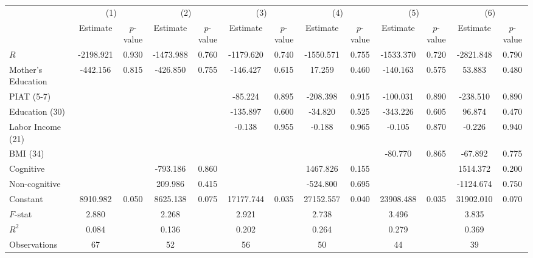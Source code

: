 
\begin{tabular}{lcccccccccccc} \toprule
 & \multicolumn{2}{c}{(1)}  &  \multicolumn{2}{c}{(2)}  &  \multicolumn{2}{c}{(3)}  &  \multicolumn{2}{c}{(4)}  & \multicolumn{2}{c}{(5)} & \multicolumn{2}{c}{(6)} \\  
 & Estimate & $p$-value & Estimate & $p$-value & Estimate & $p$-value & Estimate & $p$-value & Estimate & $p$-value & Estimate & $p$-value \\ \midrule
$R$ & -2198.921 &     0.930 & -1473.988 &     0.760 & -1179.620 &     0.740 & -1550.571 &     0.755 & -1533.370 &     0.720 & -2821.848 &     0.790 \\  
Mother's Education &  -442.156 &     0.815 &  -426.850 &     0.755 &  -146.427 &     0.615 &    17.259 &     0.460 &  -140.163 &     0.575 &    53.883 &     0.480 \\  
PIAT (5-7) &         &         &         &         &   -85.224 &     0.895 &  -208.398 &     0.915 &  -100.031 &     0.890 &  -238.510 &     0.890 \\  
Education (30) &         &         &         &         &  -135.897 &     0.600 &   -34.820 &     0.525 &  -343.226 &     0.605 &    96.874 &     0.470 \\  
Labor Income (21) &         &         &         &         &    -0.138 &     0.955 &    -0.188 &     0.965 &    -0.105 &     0.870 &    -0.226 &     0.940 \\  
BMI (34) &         &         &         &         &         &         &         &         &   -80.770 &     0.865 &   -67.892 &     0.775 \\  
Cognitive &         &         &  -793.186 &     0.860 &         &         &  1467.826 &     0.155 &         &         &  1514.372 &     0.200 \\  
Non-cognitive &         &         &   209.986 &     0.415 &         &         &  -524.800 &     0.695 &         &         & -1124.674 &     0.750 \\  
Constant &  8910.982 &     0.050 &  8625.138 &     0.075 & 17177.744 &     0.035 & 27152.557 &     0.040 & 23908.488 &     0.035 & 31902.010 &     0.070 \\  \midrule
$F$-stat &     2.880 &         &     2.268 &         &     2.921 &         &     2.738 &         &     3.496 &         &     3.835 &         \\  
$R^2$ &     0.084 &         &     0.136 &         &     0.202 &         &     0.264 &         &     0.279 &         &     0.369 &         \\  
Observations &    67 &         &    52 &         &    56 &         &    50 &         &    44 &         &    39 &         \\  
\bottomrule \end{tabular}

